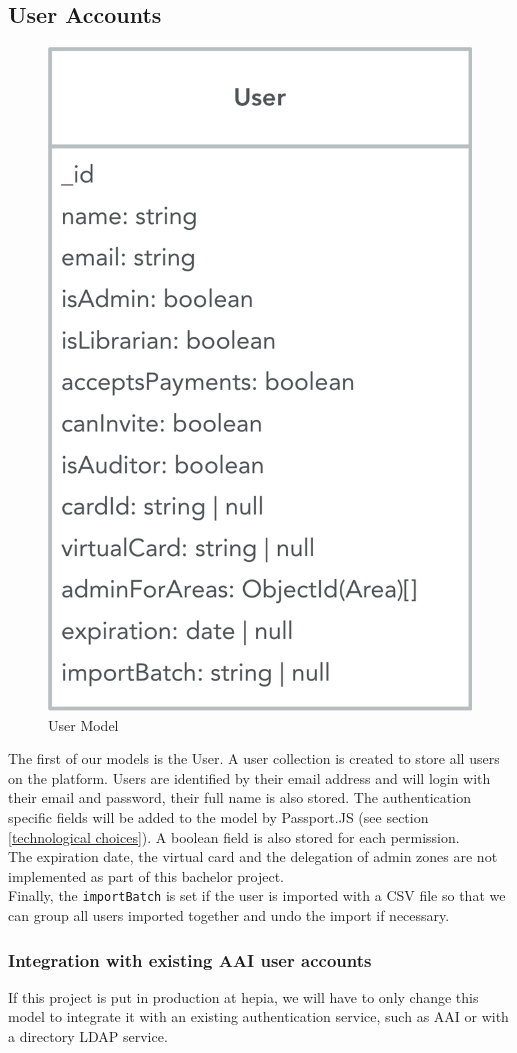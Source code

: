 \documentclass[twoside, openright,11pt,a4paper]{book}
\begin{document}
\subsection{User Accounts}
\begin{figure}[H]
\begin{center}
	\includegraphics[width=.4\textwidth]{assets/user_model}
	\caption{User Model}
\end{center}
\end{figure}

The first of our models is the User. A user collection is created to store all users on the platform. Users are identified by their email address and will login with their email and password, their full name is also stored. The authentication specific fields will be added to the model by Passport.JS (see section \ref{technological choices}). A boolean field is also stored for each permission.\\

The expiration date, the virtual card and the delegation of admin zones are not implemented as part of this bachelor project. \\

Finally, the \verb+importBatch+ is set if the user is imported with a CSV file so that we can group all users imported together and undo the import if necessary.
\subsubsection{Integration with existing AAI user accounts}
If this project is put in production at hepia, we will have to only change this model to integrate it with an existing authentication service, such as AAI or with a directory LDAP service.\\
\end{document}
